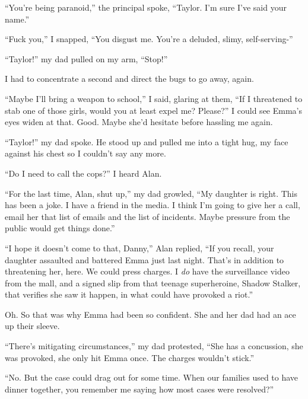 ``You're being paranoid,'' the principal spoke, ``Taylor.  I'm sure I've said your name.''



``Fuck you,'' I snapped, ``You disgust me.  You're a deluded, slimy, self-serving-''



``Taylor!'' my dad pulled on my arm, ``Stop!''



I had to concentrate a second and direct the bugs to go away, again.



``Maybe I'll bring a weapon to school,'' I said, glaring at them, ``If I threatened to stab one of those girls, would you at least expel me?  Please?''  I could see Emma's eyes widen at that.  Good.  Maybe she'd hesitate before hassling me again.



``Taylor!'' my dad spoke.  He stood up and pulled me into a tight hug, my face against his chest so I couldn't say any more.



``Do I need to call the cops?'' I heard Alan.



``For the last time, Alan, shut up,'' my dad growled, ``My daughter is right.  This has been a joke.  I have a friend in the media.  I think I'm going to give her a call, email her that list of emails and the list of incidents.  Maybe pressure from the public would get things done.''



``I hope it doesn't come to that, Danny,'' Alan replied, ``If you recall, your daughter assaulted and battered Emma just last night.  That's in addition to threatening her, here.  We could press charges.  I \emph{do} have the surveillance video from the mall, and a signed slip from that teenage superheroine, Shadow Stalker, that verifies she saw it happen, in what could have provoked a riot.''



Oh.  So that was why Emma had been so confident.  She and her dad had an ace up their sleeve.



``There's mitigating circumstances,'' my dad protested, ``She has a concussion, she was provoked, she only hit Emma once.  The charges wouldn't stick.''



``No.  But the case could drag out for some time.  When our families used to have dinner together, you remember me saying how most cases were resolved?''



